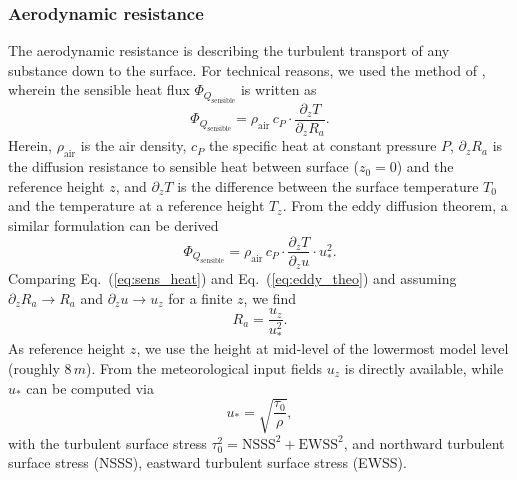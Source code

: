 \documentclass[gmd, manuscript]{copernicus}
\begin{document}
\subsubsection{Aerodynamic resistance}
\label{subsubsec:Ra}
The aerodynamic resistance is describing the turbulent transport of any substance down to the surface. %
For technical reasons, we used the method of \citet{Monteith1973}, wherein the sensible heat flux $\Phi_{Q_\text{sensible}}$ is written as
\begin{equation}
  \Phi_{Q_\text{sensible}} = \rho_\text{air}\,c_P \cdot \frac{\partial_z T}{\partial_z R_a}.
  \label{eq:sens_heat}
\end{equation}
Herein, $\rho_\text{air}$ is the air density, $c_P$ the specific heat at constant pressure $P$, $\partial_z R_a$ is the diffusion resistance to sensible heat between surface ($z_0 = 0$) and the reference height $z$, and $\partial_z T$ is the difference between the surface temperature $T_0$ and the temperature at a reference height $T_z$. From the eddy diffusion theorem, a similar formulation can be derived
\begin{equation}
  \Phi_{Q_\text{sensible}} = \rho_\text{air}\,c_P \cdot \frac{\partial_z T}{\partial_z u} \cdot u_*^2.
  \label{eq:eddy_theo}
\end{equation}
Comparing Eq.~(\ref{eq:sens_heat}) and Eq.~(\ref{eq:eddy_theo}) and assuming $\partial_z R_a \rightarrow R_a $ and $\partial_z u \rightarrow u_z $ for a finite $z$, we find 
\begin{equation}
  R_a = \frac{u_z}{u_*^2}.
\end{equation}
As reference height $z$, we use the height at mid-level of the lowermost model level (roughly $8\,\unit{m}$). From the meteorological input fields $u_z$ is directly available, while $u_*$ can be computed via
\begin{equation}
  u_* = \sqrt{\frac{\tau_0}{\rho}},
\end{equation}
with the turbulent surface stress $\tau_0^2 = \text{NSSS}^2 + \text{EWSS}^2$, and northward turbulent surface stress (NSSS), eastward turbulent surface stress (EWSS).
\end{document}
